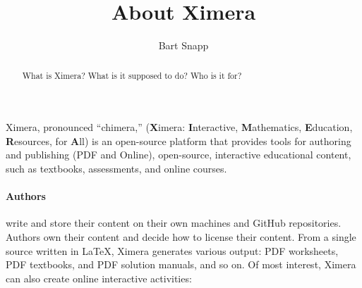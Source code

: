 \documentclass{ximera}
\title{About Ximera}
\author{Bart Snapp}
\begin{document}
\begin{abstract}
    What is Ximera? What is it supposed to do? Who is it for?
\end{abstract}
\maketitle

Ximera, pronounced ``chimera,'' (\textbf{X}imera: \textbf{I}nteractive,
\textbf{M}athematics, \textbf{E}ducation,
\textbf{R}esources, for \textbf{A}ll) is an open-source platform that provides
tools for
authoring and publishing (PDF and Online), open-source, interactive educational
content, such as textbooks, assessments, and online courses.

\paragraph{Authors}  write and store their content on their own
machines and GitHub repositories.
Authors own their content and decide how to license their content. From a
single source written in \LaTeX, Ximera generates various output: PDF
worksheets, PDF textbooks, and	PDF solution manuals, and so on. Of most interest,
Ximera can also create online interactive activities:
\begin{image}
\end{image}
\end{document}
